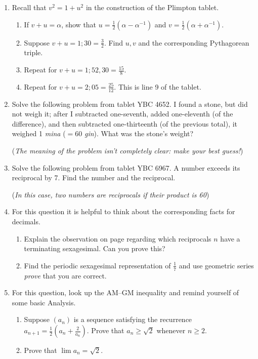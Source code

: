 \begin{exercises*}{}{}
\begin{enumerate}
	  
	  \item\label{exs:plimpton}%
	  Recall that $v^2=1+u^2$ in the construction of the Plimpton tablet.
	  \begin{enumerate}
	    \item If $v+u=\alpha$, show that $u=\frac 12(\alpha-\alpha^{-1})$ and $v=\frac 12(\alpha+\alpha^{-1})$.
	    \item Suppose $v+u=1;30=\frac 32$. Find $u,v$ and the corresponding Pythagorean triple.
	  	\item Repeat for $v+u=1;52,30=\frac{15}8$.
	  	\item Repeat for $v+u=2;05=\frac{25}{12}$. This is line 9 of the tablet.
	  \end{enumerate}
	
	  
	  \item%
	  Solve the following problem from tablet YBC 4652. I found a stone, but did not weigh it; after I subtracted one-seventh, added one-eleventh (of the difference), and then subtracted one-thirteenth (of the previous total), it weighed 1 \emph{mina} ($=60$ \emph{gin}). What was the stone's weight?\par
	  (\emph{The meaning of the problem isn't completely clear: make your best guess!})
	  
	  
	  \item%
	  Solve the following problem from tablet YBC 6967. A number exceeds its reciprocal by 7. Find the number and the reciprocal.\par
	  (\emph{In this case, two numbers are reciprocals if their product is 60})
	
	
	  \item For this question it is helpful to think about the corresponding facts for decimals.
	  \begin{enumerate}
	    \item Explain the observation on page \pageref{babfraction} regarding which reciprocals $n$ have a terminating sexagesimal. Can you prove this?
	  	\item Find the periodic sexagesimal representation of $\frac 17$ and use geometric series \emph{prove} that you are correct.
	  \end{enumerate}  
	  
	  
	  \item\label{exs:methodmean}
	  For this question, look up the AM--GM inequality and remind yourself of some basic Analysis.
	  \begin{enumerate}
			\item Suppose $(a_n)$ is a sequence satisfying the recurrence $a_{n+1}=\frac 12(a_n+\frac 2{a_n})$. Prove that $a_n\ge \sqrt 2$ whenever $n\ge 2$.
			\item Prove that $\lim a_n=\sqrt 2$.
		\end{enumerate}
	  

\end{enumerate}
\end{exercises*}
